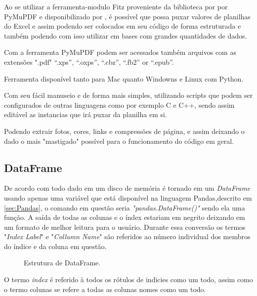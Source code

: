 \par Ao se utilizar a ferramenta-modulo Fitz proveniente da biblioteca por por PyMuPDF e disponibilizado por \textcite{MUPDF}, é possível que possa puxar valores de planilhas do Excel e assim podendo ser colocados em seu código de forma estruturada e também podendo com isso utilizar em bases com grandes quantidades de dados.
\par Com a ferramenta PyMuPDF podem ser acessados também arquivos com as extensões ".pdf" “.xps”, “.oxps”, “.cbz”, “.fb2” or “.epub”.
\par Ferramenta disponível tanto para Mac quanto Windowns e Linux com Python.
\par Com seu fácil manuseio e de forma mais simples, utilizando scripts que podem ser configurados de outras linguagens como por exemplo C e C++, sendo assim editável as instancias que irá puxar da planilha em si.
\par Podendo extrair fotos, cores, links e compressões de página, e assim deixando o dado o mais "mastigado" possível para o funcionamento do código em geral.

\subsection{DataFrame}\label{sec:dataframe}

\par De acordo com \textcite{Petrou2017-no} todo dado em um disco de memória é tornado em um \textit{DataFrame} usando apenas uma variável que está disponível na linguagem Pandas,descrito em \autoref{sec:Pandas}, o comando em questão seria \textit{"pandas.DataFrame()"} sendo ela uma função. A saída de todas as colunas e o índex estariam em negrito deixando em um formato de melhor leitura para o usuário. Durante essa conversão os termos "\textit{Index Label}" e "\textit{Collumn Name}"  são referidos ao número individual dos membros do índice e da coluna em questão.
\begin{figure}[!]
    \caption{\label{fig:Fig_2}Estrutura de DataFrame.}
    \begin{center}
    \end{center}
\end{figure}
\par O termo \textit{index} é referido à todos os rótulos de indicies como um todo, assim como o termo colunas se refere a todas as colunas
nomes como um todo.

